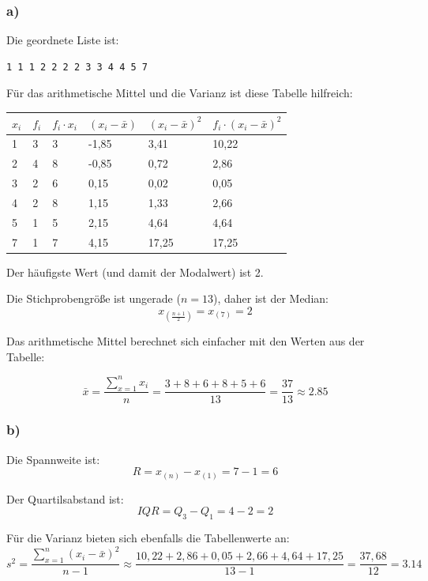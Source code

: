 \documentclass[
  11pt,
  ngerman,
  a4paper,
]{report}
\begin{document}
\hypertarget{a-4}{%
\subsubsection{a)}\label{a-4}}

Die geordnete Liste ist:

\begin{verbatim}
1 1 1 2 2 2 2 3 3 4 4 5 7
\end{verbatim}

Für das arithmetische Mittel und die Varianz ist diese Tabelle hilfreich:

\begin{table}[H]
\centering
\begin{tabular}{llllll}
\toprule
$x_i$ & $f_i$ & $f_i\cdot x_i$ & $(x_i-\bar{x})$ & $(x_i-\bar{x})^2$ & $f_i\cdot(x_i-\bar{x})^2$\\
\midrule
1 & 3 & 3 & -1,85 & 3,41 & 10,22\\
2 & 4 & 8 & -0,85 & 0,72 & 2,86\\
3 & 2 & 6 & 0,15 & 0,02 & 0,05\\
4 & 2 & 8 & 1,15 & 1,33 & 2,66\\
5 & 1 & 5 & 2,15 & 4,64 & 4,64\\
7 & 1 & 7 & 4,15 & 17,25 & 17,25\\
\bottomrule
\end{tabular}
\end{table}

Der häufigste Wert (und damit der Modalwert) ist 2.

Die Stichprobengröße ist ungerade (\(n=13\)), daher ist der Median: \[x_{(\frac{n+1}{2})} = x_{(7)} = 2\]

Das arithmetische Mittel berechnet sich einfacher mit den Werten aus der Tabelle:

\[\bar{x}={\displaystyle\frac{\sum\limits_{x=1}^nx_i}{n}}=\frac{3+8+6+8+5+6}{13}=\frac{37}{13}\approx2.85\]

\hypertarget{b-4}{%
\subsubsection{b)}\label{b-4}}

Die Spannweite ist: \[R=x_{(n)}-x_{(1)}=7-1=6\]

Der Quartilsabstand ist: \[\mathit{IQR}=Q_3-Q_1=4-2=2\]

Für die Varianz bieten sich ebenfalls die Tabellenwerte an: \[s^2=\frac{\sum\limits_{x=1}^n(x_i-\bar{x})^2}{n-1}\approx\frac{10,22+ 2,86+ 0,05+ 2,66+ 4,64+17,25}{13-1}=\frac{37,68}{12}=3.14\]
\end{document}
